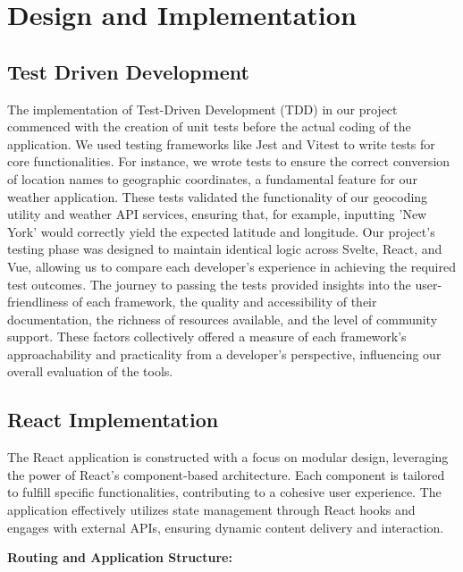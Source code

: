 \section{Design and Implementation}

\subsection{Test Driven Development}

The implementation of Test-Driven Development (TDD) in our project commenced with the creation of unit tests before the actual coding of the application. We used testing frameworks like Jest and Vitest to write tests for core functionalities. For instance, we wrote tests to ensure the correct conversion of location names to geographic coordinates, a fundamental feature for our weather application. These tests validated the functionality of our geocoding utility and weather API services, ensuring that, for example, inputting 'New York' would correctly yield the expected latitude and longitude. Our project's testing phase was designed to maintain identical logic across Svelte, React, and Vue, allowing us to compare each developer's experience in achieving the required test outcomes. The journey to passing the tests provided insights into the user-friendliness of each framework, the quality and accessibility of their documentation, the richness of resources available, and the level of community support. These factors collectively offered a measure of each framework's approachability and practicality from a developer's perspective, influencing our overall evaluation of the tools.





\subsection{React Implementation}

The React application is constructed with a focus on modular design, leveraging the power of React's component-based architecture. Each component is tailored to fulfill specific functionalities, contributing to a cohesive user experience. The application effectively utilizes state management through React hooks and engages with external APIs, ensuring dynamic content delivery and interaction.

\textbf{Routing and Application Structure:}




